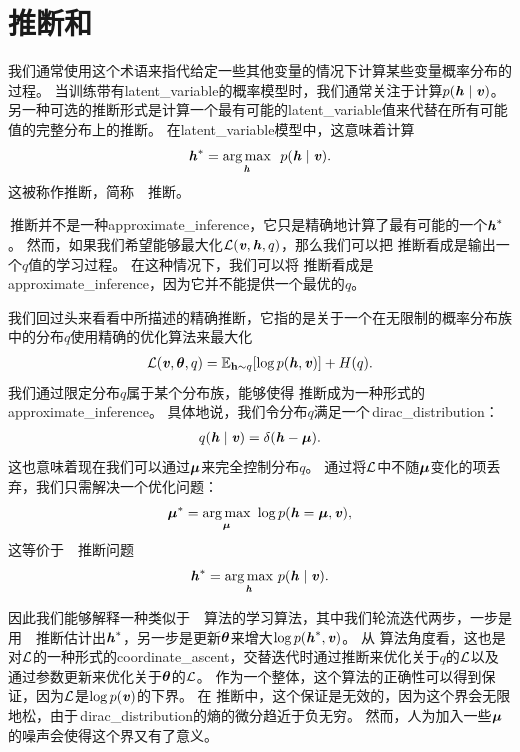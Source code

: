 \section{推断和}
\label{sec:map_inference_and_sparse_coding}


我们通常使用这个术语来指代给定一些其他变量的情况下计算某些变量概率分布的过程。
当训练带有\gls{latent_variable}的概率模型时，我们通常关注于计算$p(\boldsymbol{\mathit{h}}\mid\boldsymbol{\mathit{v}})$。
另一种可选的推断形式是计算一个最有可能的\gls{latent_variable}值来代替在所有可能值的完整分布上的推断。
在\gls{latent_variable}模型中，这意味着计算
\begin{align}
\boldsymbol{\mathit{h}}^* = \underset{\boldsymbol{\mathit{h}}}{\arg\max} \ \  p(\boldsymbol{\mathit{h}}\mid\boldsymbol{\mathit{v}}).
\end{align}
这被称作推断，简称~~推断。



\,推断并不是一种\gls{approximate_inference}，它只是精确地计算了最有可能的一个$\boldsymbol{\mathit{h}}^*$。
然而，如果我们希望能够最大化$\mathcal{L}(\boldsymbol{\mathit{v}},\boldsymbol{\mathit{h}},q)$，那么我们可以把\,\,推断看成是输出一个$q$值的学习过程。%
在这种情况下，我们可以将\,\,推断看成是\gls{approximate_inference}，因为它并不能提供一个最优的$q$。



我们回过头来看看中所描述的精确推断，它指的是关于一个在无限制的概率分布族中的分布$q$使用精确的优化算法来最大化
\begin{align}
\mathcal{L}(\boldsymbol{\mathit{v}},{\boldsymbol{\theta}},q)
 = \mathbb{E}_{\mathbf{h}\sim q}[\log p(\boldsymbol{\mathit{h}} , \boldsymbol{\mathit{v}})] + H(q).
\end{align}
我们通过限定分布$q$属于某个分布族，能够使得\,\,推断成为一种形式的\gls{approximate_inference}。
具体地说，我们令分布$q$满足一个\,\gls{dirac_distribution}：
\begin{align}
q(\boldsymbol{\mathit{h}}\mid\boldsymbol{\mathit{v}}) = \delta(\boldsymbol{\mathit{h}} - {\boldsymbol{\mu}}).
\end{align}
这也意味着现在我们可以通过$\boldsymbol{\mu}$来完全控制分布$q$。
通过将$\mathcal{L}$中不随$\boldsymbol{\mu}$变化的项丢弃，我们只需解决一个优化问题：
\begin{align}
\boldsymbol{\mu}^*  =  \underset{\boldsymbol{\mu}}{\arg\max}\ \log p(\boldsymbol{\mathit{h}} = \boldsymbol{\mu},\boldsymbol{\mathit{v}}),
\end{align}
这等价于~~推断问题
\begin{align}
\boldsymbol{\mathit{h}}^* = \underset{\boldsymbol{\mathit{h}}}{\arg\max}\  p(\boldsymbol{\mathit{h}}\mid\boldsymbol{\mathit{v}}).
\end{align}




因此我们能够解释一种类似于~~算法的学习算法，其中我们轮流迭代两步，一步是用~~推断估计出$\boldsymbol{\mathit{h}}^*$，另一步是更新$\boldsymbol{\theta}$来增大$\log p(\boldsymbol{\mathit{h}}^*,\boldsymbol{\mathit{v}})$。
从\,\,算法角度看，这也是对$\mathcal{L}$的一种形式的\gls{coordinate_ascent}，交替迭代时通过推断来优化关于$q$的$\mathcal{L}$以及通过参数更新来优化关于$\boldsymbol{\theta}$的$\mathcal{L}$。
作为一个整体，这个算法的正确性可以得到保证，因为$\mathcal{L}$是$\log p(\boldsymbol{\mathit{v}})$的下界。
在\,\,推断中，这个保证是无效的，因为这个界会无限地松，由于\,\gls{dirac_distribution}的熵的微分趋近于负无穷。
然而，人为加入一些$\boldsymbol{\mu}$的噪声会使得这个界又有了意义。



